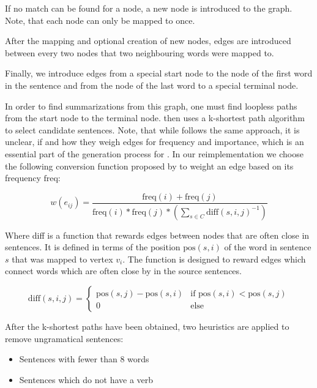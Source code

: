 \documentclass[a4paper,BCOR=10mm]{report}
\begin{document}
If no match can be found for a node, a new node is introduced to the graph. Note, that each node can only be mapped to once.

After the mapping and optional creation of new nodes, edges are introduced between every two nodes that two neighbouring words were mapped to.

Finally, we introduce edges from a special start node to the node of the first word in the sentence and from the node of the last word to a special terminal node.

In order to find summarizations from this graph, one must find loopless paths from the start node to the terminal node. \citeauthor{fillipova} then uses a k-shortest path algorithm to select candidate sentences. Note, that while \citeauthor{banerjee} follows the same approach, it is unclear, if and how they weigh edges for frequency and importance, which is an essential part of the generation process for \citeauthor{fillipova}.
In our reimplementation we choose the following conversion function proposed by \citeauthor{fillipova} to weight an edge based on its frequency $\text{freq}$:

\begin{displaymath}
w(e_{ij}) = \frac{\text{freq}(i) + \text{freq}(j)} {\text{freq}(i) * \text{freq}(j) * (\sum_{s \in C} \text{diff}(s, i, j)^{-1})}
\end{displaymath}

Where diff is a function that rewards edges between nodes that are often close in sentences. It is defined in terms of the position $\text{pos}(s, i)$ of the word in sentence $s$ that was mapped to vertex $v_i$.
The function is designed to reward edges which connect words which are often close by in the source sentences.

\begin{displaymath}
\text{diff}(s, i, j) = \begin{cases}
\text{pos}(s, j) - \text{pos}(s, i) & \text{if }\text{pos}(s, i) < \text{pos}(s, j) \\
0 & \text{else}
\end{cases}
\end{displaymath}

After the k-shortest paths have been obtained, two heuristics are applied to remove ungramatical sentences:

\begin{itemize}
    \item {Sentences with fewer than $8$ words}
    \item {Sentences which do not have a verb}
\end{itemize}
\end{document}

